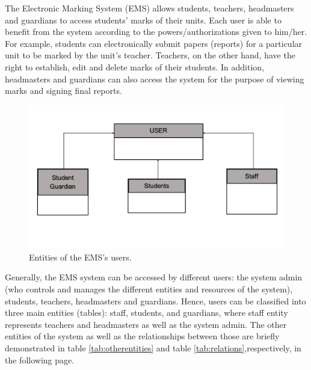 The Electronic Marking System (EMS) allows students, teachers, headmasters and guardians to access students' marks of their units.  Each user is able to benefit from the system according to the powers/authorizations given to him/her.  For example, students can electronically submit papers (reports) for a particular unit to be marked by the unit's teacher.  Teachers, on the other hand, have the right to establish, edit and delete marks of their students.  In addition, headmasters and guardians can also access the system for the purpose of viewing marks and signing final reports.  

\begin{figure}[bht]
\centering
\includegraphics[scale=0.26]{EMSEntities.png}
\caption{Entities of the EMS's users.}
\label{fig:RBACPol}
\end{figure}

Generally, the EMS system can be accessed by different users: the system admin (who controls and manages the different entities and resources of the system), students, teachers, headmasters and guardians.  Hence, users can be classified into three main entities (tables): staff, students, and guardians, where staff entity represents teachers and headmasters as well as the system admin.
The other entities of the system as well as the relationships between those are briefly demonstrated in table \ref{tab:otherentities} and table \ref{tab:relations},respectively, in the following page.

